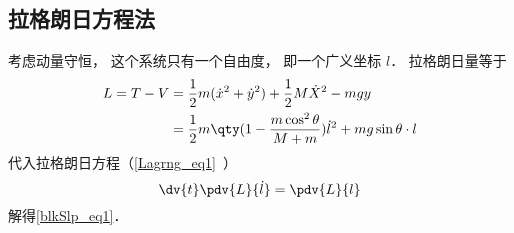 \subsection{拉格朗日方程法}
考虑动量守恒， 这个系统只有一个自由度， 即一个广义坐标 $l$． 拉格朗日量等于
\begin{equation}
\begin{aligned}
L = T - V &= \frac12 m(\dot x^2 + \dot y^2) + \frac12 M \dot X^2 - mgy\\
&= \frac{1}{2}m \qty(1 - \frac{m\cos^2\theta}{M + m}) \dot l^2 + mg\sin\theta \cdot l
\end{aligned}
\end{equation}
代入拉格朗日方程（\autoref{Lagrng_eq1}~）
\begin{equation}
\dv{t} \pdv{L}{\dot l} = \pdv{L}{l}
\end{equation}
解得\autoref{blkSlp_eq1}．
